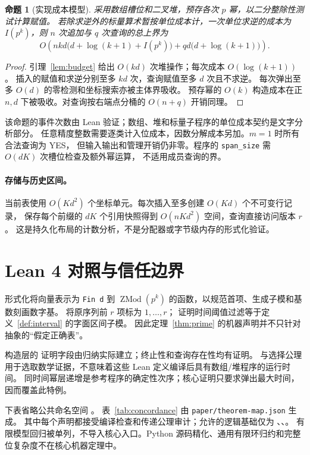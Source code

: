 \documentclass[11pt,a4paper,fontset=fandol]{ctexart}
\theoremstyle{definition}
\theoremstyle{plain}
\newtheorem{proposition}{命题}
\begin{document}
\begin{proposition}[实现成本模型]\label{prop:cost}
采用数组槽位和二叉堆，预存各次 $p$ 幂，以二分整除性测试计算赋值。
若除求逆外的标量算术暂按单位成本计，一次单位求逆的成本为 $I(p^k)$，则
$n$ 次追加与 $q$ 次查询的总上界为
\begin{equation}\label{eq:runtime}
 O\!\left(nkd\bigl(d+\log(k+1)+I(p^k)\bigr)
       +qd\bigl(d+\log(k+1)\bigr)\right).
\end{equation}
\end{proposition}
\begin{proof}
引理~\ref{lem:budget} 给出 $O(kd)$ 次堆操作；每次成本 $O(\log(k+1))$。
插入的赋值和求逆分别至多 $kd$ 次，查询赋值至多 $d$ 次且不求逆。
每次弹出至多 $O(d)$ 的零检测和坐标搜索亦被主体界吸收。
预存幂的 $O(k)$ 构造成本在正 $n,d$ 下被吸收。对查询按右端点分桶的 $O(n+q)$ 开销同理。
\end{proof}
该命题的事件次数由 Lean 验证；数组、堆和标量子程序的单位成本契约是文字分析部分。
任意精度整数需要逐类计入位成本，因数分解成本另加。$m=1$ 时所有合法查询为 YES，
但输入输出和管理开销仍非零。程序的 \texttt{span\_size} 需 $O(dK)$ 次槽位检查及额外幂运算，
不适用成员查询的界。

\paragraph{存储与历史区间。}
当前表使用 $O(Kd^2)$ 个坐标单元。每次插入至多创建 $O(Kd)$ 个不可变行记录，
保存每个前缀的 $dK$ 个引用快照得到 $O(nKd^2)$ 空间，查询直接访问版本 $r$。
这是持久化布局的计数分析，不是分配器或字节级内存的形式化验证。

\section{Lean 4 对照与信任边界}
形式化将向量表示为 \texttt{Fin d} 到 $\operatorname{ZMod}(p^k)$ 的函数，以规范首项、生成子模和基数刻画数字基。
 将原序列前 $r$ 项标为 $1,\ldots,r$；
 证明时间阈值过滤等于定义~\ref{def:interval} 的字面区间子模。
因此定理~\ref{thm:prime} 的机器声明并不只针对抽象的“假定正确表”。

构造层的  证明字段由归纳实际建立；终止性和查询存在性均有证明。
 与选择公理用于选取数学证据，不意味着这些 Lean 定义编译后具有数组/堆程序的运行时间。
同时间幂层递增是参考程序的确定性次序；核心证明只要求弹出最大时间，因而覆盖此特例。

下表省略公共命名空间 。
表~\ref{tab:concordance} 由 \texttt{paper/theorem-map.json} 生成。
其中每个声明都接受编译检查和传递公理审计；允许的逻辑基础仅为
、、。
有限模型回归被单列，不导入核心入口。Python 源码精化、通用有限环归约和完整位复杂度不在核心机器定理中。

\end{document}
